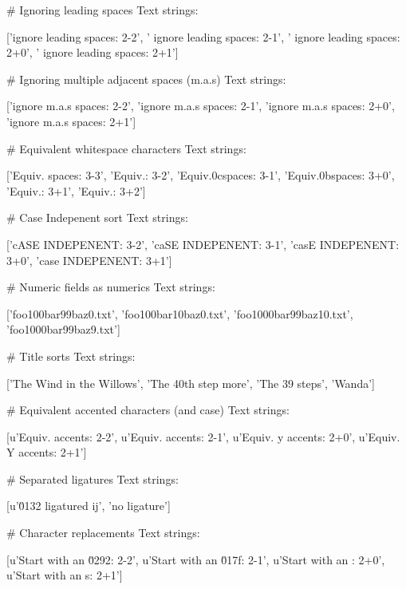 \begin{wideverbatim}
# Ignoring leading spaces
Text strings:

['ignore leading spaces: 2-2', ' ignore leading spaces: 2-1', ' ignore
leading spaces: 2+0', ' ignore leading spaces: 2+1']

# Ignoring multiple adjacent spaces (m.a.s)
Text strings:

['ignore m.a.s spaces: 2-2', 'ignore m.a.s spaces: 2-1', 'ignore m.a.s
spaces: 2+0', 'ignore m.a.s spaces: 2+1']


# Equivalent whitespace characters
Text strings:

['Equiv. spaces: 3-3', 'Equiv.\rspaces: 3-2', 'Equiv.\x0cspaces: 3-1',
'Equiv.\x0bspaces: 3+0', 'Equiv.\nspaces: 3+1', 'Equiv.\tspaces: 3+2']

# Case Indepenent sort
Text strings:

['cASE INDEPENENT: 3-2', 'caSE INDEPENENT: 3-1', 'casE INDEPENENT:
3+0', 'case INDEPENENT: 3+1']

# Numeric fields as numerics
Text strings:

['foo100bar99baz0.txt', 'foo100bar10baz0.txt',
'foo1000bar99baz10.txt', 'foo1000bar99baz9.txt']

# Title sorts
Text strings:

['The Wind in the Willows', 'The 40th step more', 'The 39 steps',
'Wanda']

# Equivalent accented characters (and case)
Text strings:

[u'Equiv. \xfd accents: 2-2', u'Equiv. \xdd accents: 2-1', u'Equiv. y
accents: 2+0', u'Equiv. Y accents: 2+1']


# Separated ligatures
Text strings:

[u'\u0132 ligatured ij', 'no ligature']

# Character replacements
Text strings:

[u'Start with an \u0292: 2-2', u'Start with an \u017f: 2-1', u'Start
with an \xdf: 2+0', u'Start with an s: 2+1']
\end{wideverbatim}



